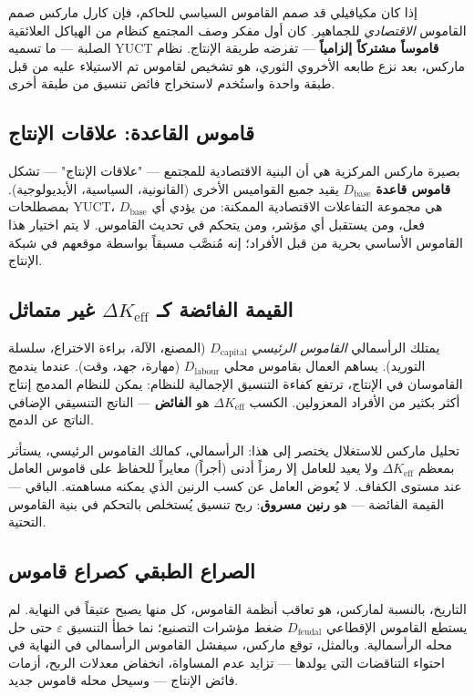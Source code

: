 \documentclass[12pt,a4paper]{article}
\newcommand{\Keff}{K_{\mathrm{eff}}}
\begin{document}
	إذا كان مكيافيلي قد صمم القاموس السياسي للحاكم، فإن كارل ماركس صمم القاموس \emph{الاقتصادي} للجماهير. كان أول مفكر وصف المجتمع كنظام من الهياكل العلائقية الصلبة — ما تسميه YUCT \textbf{قاموساً مشتركاً إلزامياً} — تفرضه طريقة الإنتاج. نظام ماركس، بعد نزع طابعه الأخروي الثوري، هو تشخيص لقاموس تم الاستيلاء عليه من قبل طبقة واحدة واستُخدم لاستخراج فائض تنسيق من طبقة أخرى.
	
	\subsection{قاموس القاعدة: علاقات الإنتاج}
	
	بصيرة ماركس المركزية هي أن البنية الاقتصادية للمجتمع — "علاقات الإنتاج" — تشكل \textbf{قاموس قاعدة} \(D_{\text{base}}\) يقيد جميع القواميس الأخرى (القانونية، السياسية، الأيديولوجية). بمصطلحات YUCT، \(D_{\text{base}}\) هي مجموعة التفاعلات الاقتصادية الممكنة: من يؤدي أي فعل، ومن يستقبل أي مؤشر، ومن يتحكم في تحديث القاموس. لا يتم اختيار هذا القاموس الأساسي بحرية من قبل الأفراد؛ إنه مُنصَّب مسبقاً بواسطة موقعهم في شبكة الإنتاج.
	
	\subsection{القيمة الفائضة كـ \(\Delta\Keff\) غير متماثل}
	
	يمتلك الرأسمالي \emph{القاموس الرئيسي} \(D_{\text{capital}}\) (المصنع، الآلة، براءة الاختراع، سلسلة التوريد). يساهم العمال بقاموس محلي \(D_{\text{labour}}\) (مهارة، جهد، وقت). عندما يندمج القاموسان في الإنتاج، ترتفع كفاءة التنسيق الإجمالية للنظام: يمكن للنظام المدمج إنتاج أكثر بكثير من الأفراد المعزولين. الكسب \(\Delta\Keff\) هو \textbf{الفائض} — الناتج التنسيقي الإضافي الناتج عن الدمج.
	
	تحليل ماركس للاستغلال يختصر إلى هذا: الرأسمالي، كمالك القاموس الرئيسي، يستأثر بمعظم \(\Delta\Keff\) ولا يعيد للعامل إلا رمزاً أدنى (أجراً) معايراً للحفاظ على قاموس العامل عند مستوى الكفاف. لا يُعوض العامل عن كسب الرنين الذي يمكنه مساهمته. الباقي — القيمة الفائضة — هو \textbf{رنين مسروق}: ربح تنسيق يُستخلص بالتحكم في بنية القاموس التحتية.
	
	\subsection{الصراع الطبقي كصراع قاموس}
	
	التاريخ، بالنسبة لماركس، هو تعاقب أنظمة القاموس، كل منها يصبح عتيقاً في النهاية. لم يستطع القاموس الإقطاعي \(D_{\text{feudal}}\) ضغط مؤشرات التصنيع؛ نما خطأ التنسيق \(\varepsilon\) حتى حل محله الرأسمالية. وبالمثل، توقع ماركس، سيفشل القاموس الرأسمالي في النهاية في احتواء التناقضات التي يولدها — تزايد عدم المساواة، انخفاض معدلات الربح، أزمات فائض الإنتاج — وسيحل محله قاموس جديد.
	
\end{document}

